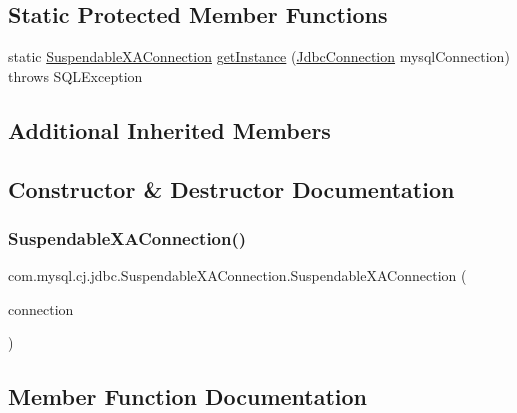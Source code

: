 \subsection*{Static Protected Member Functions}
\begin{DoxyCompactItemize}
\item 
static \mbox{\hyperlink{classcom_1_1mysql_1_1cj_1_1jdbc_1_1_suspendable_x_a_connection}{Suspendable\+X\+A\+Connection}} \mbox{\hyperlink{classcom_1_1mysql_1_1cj_1_1jdbc_1_1_suspendable_x_a_connection_aa201aea08292a81433d1061bfa4eef15}{get\+Instance}} (\mbox{\hyperlink{interfacecom_1_1mysql_1_1cj_1_1jdbc_1_1_jdbc_connection}{Jdbc\+Connection}} mysql\+Connection)  throws S\+Q\+L\+Exception 
\end{DoxyCompactItemize}
\subsection*{Additional Inherited Members}


\subsection{Constructor \& Destructor Documentation}
\mbox{\label{classcom_1_1mysql_1_1cj_1_1jdbc_1_1_suspendable_x_a_connection_ac685fd6cf1d33191f66a837e07be273c}} 
\subsubsection{\texorpdfstring{Suspendable\+X\+A\+Connection()}{SuspendableXAConnection()}}
{\footnotesize\ttfamily com.\+mysql.\+cj.\+jdbc.\+Suspendable\+X\+A\+Connection.\+Suspendable\+X\+A\+Connection (\begin{DoxyParamCaption}\item[{\mbox{\hyperlink{interfacecom_1_1mysql_1_1cj_1_1jdbc_1_1_jdbc_connection}{Jdbc\+Connection}}}]{connection }\end{DoxyParamCaption})}



\subsection{Member Function Documentation}
\mbox{\label{classcom_1_1mysql_1_1cj_1_1jdbc_1_1_suspendable_x_a_connection_ae22f87e04caefd066bf411f203a7ff5c}} 
